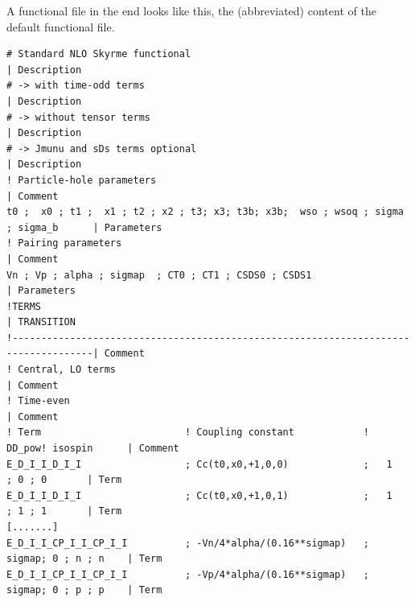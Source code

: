 \documentclass[print,amsmath,amssymb,aps,prc,nofootinbib,notitlepage]{revtex4-1}
\begin{document}
A functional file in the end looks like this, the (abbreviated) 
content of the default functional file.

\begin{Verbatim}[fontsize=\footnotesize]
# Standard NLO Skyrme functional                                                     | Description
# -> with time-odd terms                                                             | Description
# -> without tensor terms                                                            | Description
# -> Jmunu and sDs terms optional                                                    | Description
! Particle-hole parameters                                                           | Comment
t0 ;  x0 ; t1 ;  x1 ; t2 ; x2 ; t3; x3; t3b; x3b;  wso ; wsoq ; sigma ; sigma_b      | Parameters
! Pairing parameters                                                                 | Comment
Vn ; Vp ; alpha ; sigmap  ; CT0 ; CT1 ; CSDS0 ; CSDS1                                | Parameters
!TERMS                                                                               | TRANSITION
!------------------------------------------------------------------------------------| Comment
! Central, LO terms                                                                  | Comment
! Time-even                                                                          | Comment
! Term                         ! Coupling constant            ! DD_pow! isospin      | Comment
E_D_I_I_D_I_I                  ; Cc(t0,x0,+1,0,0)             ;   1    ; 0 ; 0       | Term
E_D_I_I_D_I_I                  ; Cc(t0,x0,+1,0,1)             ;   1    ; 1 ; 1       | Term
[.......]
E_D_I_I_CP_I_I_CP_I_I          ; -Vn/4*alpha/(0.16**sigmap)   ; sigmap; 0 ; n ; n    | Term
E_D_I_I_CP_I_I_CP_I_I          ; -Vp/4*alpha/(0.16**sigmap)   ; sigmap; 0 ; p ; p    | Term
\end{Verbatim}
\end{document}

